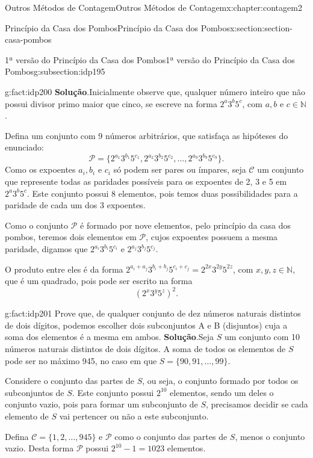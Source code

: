 \documentclass[oneside,10pt,]{book}
\newcommand{\blocktitlefont}{\relax}
\numberwithin{equation}{section}
\begin{document}
\begin{chapterptx}{Outros Métodos de Contagem}{}{Outros Métodos de Contagem}{}{}{x:chapter:contagem2}
\begin{sectionptx}{Princípio da Casa dos Pombos}{}{Princípio da Casa dos Pombos}{}{}{x:section:section-casa-pombos}
\begin{subsectionptx}{1ª versão do Princípio da Casa dos Pombos}{}{1ª versão do Princípio da Casa dos Pombos}{}{}{g:subsection:idp195}
\begin{fact}{}{}{g:fact:idp200}
\textbf{\blocktitlefont Solução}.\quad{}Inicialmente observe que, qualquer número inteiro que não possui divisor primo maior que cinco, se escreve na forma \(2^a3^b5^c\), com \(a, b\) e \(c \in \mathbb{N}\).%
\par
Defina um conjunto com 9 números arbitrários, que satisfaça as hipóteses do enunciado:%
\begin{equation*}
\mathcal{P} = \{ 2^{a_1}3^{b_1}5^{c_1}, 2^{a_2}3^{b_2}5^{c_2}, \ldots, 2^{a_9}3^{b_9}5^{c_9} \}.
\end{equation*}
Como os expoentes \(a_i, b_i\) e \(c_i\) só podem ser pares ou ímpares, seja \(\mathcal{C}\) um conjunto que represente todas as paridades possíveis para os expoentes de 2, 3 e 5 em \(2^a3^b5^c\). Este conjunto possui 8 elementos, pois temos duas possibilidades para a paridade de cada um dos 3 expoentes.%
\par
Como o conjunto \(\mathcal{P}\) é formado por nove elementos, pelo princípio da casa dos pombos, teremos dois elementos em \(\mathcal{P}\), cujos expoentes possuem a mesma paridade, digamos que \(2^{a_i}3^{b_i}5^{c_i}\) e \(2^{a_j}3^{b_j}5^{c_j}\).%
\par
O produto entre eles é da forma \(2^{a_i+a_j}3^{b_i+b_j}5^{c_i+c_j}=2^{2x}3^{2y}5^{2z}\), com \(x, y, z \in \mathbb{N}\), que é um quadrado, pois pode ser escrito na forma%
\begin{equation*}
(2^{x}3^{y}5^{z})^2\text{.}
\end{equation*}
%
\end{fact}
\begin{fact}{}{}{g:fact:idp201}%
Prove que, de qualquer conjunto de dez números naturais distintos de dois dígitos, podemos escolher dois subconjuntos A e B (disjuntos) cuja a soma dos elementos é a mesma em ambos.%
\textbf{\blocktitlefont Solução}.\quad{}Seja \(S\) um conjunto com 10 números naturais distintos de dois dígitos. A soma de todos os elementos de \(S\) pode ser no máximo 945, no caso em que \(S=\{90, 91, \ldots, 99\}\).%
\par
Considere o conjunto das partes de \(S\), ou seja, o conjunto formado por todos os subconjuntos de \(S\). Este conjunto possui \(2^{10}\) elementos, sendo um deles o conjunto vazio, pois para formar um subconjunto de \(S\), precisamos decidir se cada elemento de \(S\) vai pertencer ou não a este subconjunto.%
\par
Defina \(\mathcal{C} = \{ 1, 2, \ldots, 945 \}\) e \(\mathcal{P}\) como o conjunto das partes de \(S\), menos o conjunto vazio. Desta forma \(\mathcal{P}\) possui \(2^{10}-1 = 1023\) elementos.%

\end{fact}
\end{subsectionptx}
\end{sectionptx}
\end{chapterptx}
\end{document}
